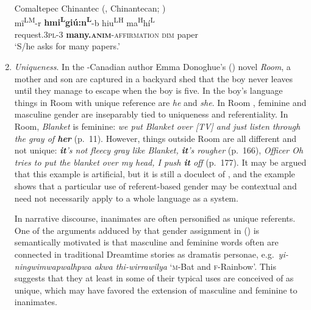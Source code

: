 \documentclass[output=collectionpaper]{langsci/langscibook}
\begin{document}
\begin{enumerate}[label=(\roman*)]
\ea\label{ex:WDG:7}
Comaltepec Chinantec (, Chinantecan; \citealt[57]{Anderson1989a})\\
\gll mï\textsuperscript{LM}-r	\textbf{hmi\textsuperscript{L}giú:n\textsuperscript{L}}-b	hiu\textsuperscript{LH}	ma\textsuperscript{H}hí\textsuperscript{L}\\
	request.3\textsc{pl}-3	\textbf{many.\textsc{anim}}-\textsc{affirmation}	\textsc{dim}	paper\\
\glt	`S/he asks for many papers.'\\
\z

\item \textit{Uniqueness}. In the -Canadian author Emma Donoghue's (\citeyear{Donoghue2010}) novel \textit{Room}, a mother and son are captured in a backyard shed that the boy never leaves until they manage to escape when the boy is five. In the boy's language things in Room with unique reference are \textit{he} and \textit{she}. In Room , feminine and masculine gender are inseparably tied to uniqueness and referentiality. In Room, \textit{Blanket} is feminine: \textit{we put Blanket over [TV] and just listen through the gray of \textbf{her}} (p.~11). However, things outside Room are all different and not unique: \textit{\textbf{it}'s not fleecy gray like Blanket, \textbf{it}'s rougher} (p.~166), \textit{Officer Oh tries to put the blanket over my head, I push \textbf{it} off} (p.~177). It may be argued that this example is artificial, but it is still a doculect of , and the example shows that a particular use of referent-based gender may be contextual and need not necessarily apply to a whole language as a system.

In narrative discourse, inanimates are often personified as unique referents. One of the arguments adduced by \cite[232]{Leeding1989} that gender assignment in  () is semantically motivated is that masculine and feminine words often are connected in traditional Dreamtime stories as dramatis personae, e.g.\ \textit{yi-ningwimwapwalhpwa akwa thi-wirrawilya} `\textsc{m}-Bat and \textsc{f}-Rainbow'. This suggests that they at least in some of their typical uses are conceived of as unique, which may have favored the extension of masculine and feminine to inanimates.


\end{enumerate}
\end{document}
